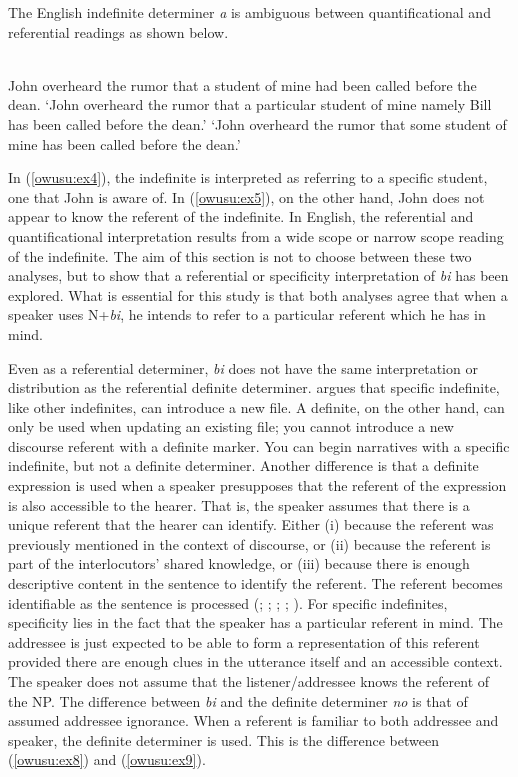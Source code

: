 \documentclass[output=paper,modfonts,nonflat,draftmode]{langsci/langscibook}
\begin{document}
The English indefinite determiner \emph{a} is ambiguous between quantificational and referential readings as shown below.

\ea
{}\\
\label{owusu:ex3}
John overheard the rumor that a student of mine had been called before the dean.
\ea \label{owusu:ex4} `John overheard the rumor that a particular student of mine namely Bill has been called before the dean.'
\ex \label{owusu:ex5} `John overheard the rumor that some student of mine has been called before the dean.'
\z 
\z 

In (\ref{owusu:ex4}), the indefinite is interpreted as referring to a specific student, one that John is aware of. In (\ref{owusu:ex5}), on the other hand, John does not appear to know the referent of the indefinite. In English, the referential and quantificational interpretation results from a wide scope or narrow scope reading of the indefinite. 
The aim of this section is not to choose between these two analyses, but to show that a referential or specificity interpretation of \emph{bi} has been explored. What is essential for this study is that both analyses agree that when a speaker uses  N+\emph{bi}, he intends to refer to a particular referent which he has in mind.            


Even as a referential determiner, \emph{bi} does not have the same interpretation or distribution as the referential definite determiner. \citet{Heim1983} argues that specific indefinite, like other indefinites, can introduce a new file. A definite, on the other hand, can only be used when updating an existing file; you cannot introduce a new discourse referent with a definite marker. You can begin narratives with a specific indefinite, but not a definite determiner. Another difference is that a definite expression is used when a speaker presupposes that the referent of the expression is also accessible to the hearer. That is, the speaker assumes that there is a unique referent that the hearer can identify. Either (i) because the referent was previously mentioned in the context of discourse, or (ii) because the referent is part of the interlocutors’ shared knowledge, or (iii) because there is enough descriptive content in the sentence to identify the referent.  The referent becomes identifiable as the sentence is processed (\citealt[135]{Comrie1989}; \citealt[450]{Givon2001}; \citealt[277]{GundelEtAlZacharski1993}; \citealt[167--168]{Hawkins1978}; \citealt[263]{Payne1997}). For specific indefinites, specificity lies in the fact that the speaker has a particular referent in mind. The addressee is just expected to be able to form a representation of this referent provided there are enough clues in the utterance itself and an accessible context. The speaker does not assume that the listener/addressee knows the referent of the NP. The difference between \emph{bi} and the definite determiner \emph{no} is that of assumed addressee ignorance. When a referent is familiar to both addressee and speaker, the definite determiner is used. This is the difference between (\ref{owusu:ex8}) and (\ref{owusu:ex9}). 
\end{document}
